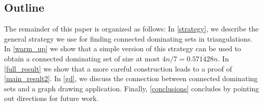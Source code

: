 \documentclass[11pt]{article}
\newtheorem{thm}{Theorem}
\newtheorem{cor}{Corollary}
\newcommand{\defin}[1]{\emph{\textcolor{Maroon}{#1}}}
\theoremstyle{definition}
\begin{document}







\subsection{Outline}

The remainder of this paper is organized as follows:  In \cref{strategy}, we describe the general strategy we use for finding connected dominating sets in triangulations.  In \cref{warm_up} we show that a simple version of this strategy can be used to obtain a connected dominating set of size at most $4n/7= 0.\overline{571428}n$.
In \cref{full_result} we show that a more careful construction leads to a proof of \cref{main_result2}. In \cref{gd}, we discuss the connection between connected dominating sets and a graph drawing application. Finally, \cref{conclusions} concludes by pointing out directions for future work.
\end{document}
